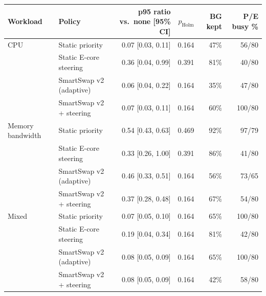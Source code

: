 \begin{tabular}{llrrrr}
\toprule
Workload & Policy & p95 ratio vs.\ none [95\% CI] & $p_{\mathrm{Holm}}$ & BG kept & P/E busy \% \\
\midrule
CPU & Static priority & 0.07 [0.03, 0.11] & 0.164 & 47\% & 56/80 \\
 & Static E-core steering & 0.36 [0.04, 0.99] & 0.391 & 81\% & 40/80 \\
 & SmartSwap v2 (adaptive) & 0.06 [0.04, 0.22] & 0.164 & 35\% & 47/80 \\
 & SmartSwap v2 + steering & 0.07 [0.03, 0.11] & 0.164 & 60\% & 100/80 \\
\midrule
Memory bandwidth & Static priority & 0.54 [0.43, 0.63] & 0.469 & 92\% & 97/79 \\
 & Static E-core steering & 0.33 [0.26, 1.00] & 0.391 & 86\% & 41/80 \\
 & SmartSwap v2 (adaptive) & 0.46 [0.33, 0.51] & 0.164 & 56\% & 73/65 \\
 & SmartSwap v2 + steering & 0.37 [0.28, 0.48] & 0.164 & 67\% & 54/80 \\
\midrule
Mixed & Static priority & 0.07 [0.05, 0.10] & 0.164 & 65\% & 100/80 \\
 & Static E-core steering & 0.19 [0.04, 0.34] & 0.164 & 81\% & 42/80 \\
 & SmartSwap v2 (adaptive) & 0.08 [0.05, 0.09] & 0.164 & 65\% & 100/80 \\
 & SmartSwap v2 + steering & 0.08 [0.05, 0.09] & 0.164 & 42\% & 58/80 \\
\bottomrule
\end{tabular}